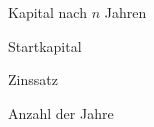 \par
{} Kapital nach $n$ Jahren\par
{} Startkapital\par
{}     Zinssatz\par
{}     Anzahl der Jahre\par




